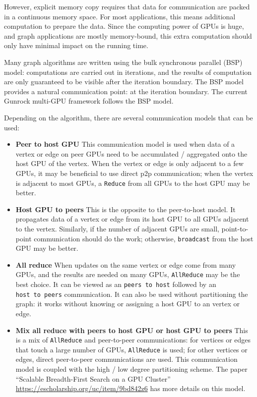 \documentclass[10pt,oneside]{memoir}
\begin{document}
However, explicit memory copy requires that data for communication are
packed in a continuous memory space. For most applications, this means
additional computation to prepare the data. Since the computing power of
GPUs is huge, and graph applications are mostly memory-bound, this extra
computation should only have minimal impact on the running time.

Many graph algorithms are written using the bulk synchronous parallel
(BSP) model: computations are carried out in iterations, and the results
of computation are only guaranteed to be visible after the iteration
boundary. The BSP model provides a natural communication point: at the
iteration boundary. The current Gunrock multi-GPU framework follows the
BSP model.

Depending on the algorithm, there are several communication models that
can be used:

\begin{itemize}
\item
  \textbf{Peer to host GPU} This communication model is used when data
  of a vertex or edge on peer GPUs need to be accumulated / aggregated
  onto the host GPU of the vertex. When the vertex or edge is only
  adjacent to a few GPUs, it may be beneficial to use direct p2p
  communication; when the vertex is adjacent to most GPUs, a
  \texttt{Reduce} from all GPUs to the host GPU may be better.
\item
  \textbf{Host GPU to peers} This is the opposite to the peer-to-host
  model. It propagates data of a vertex or edge from its host GPU to all
  GPUs adjacent to the vertex. Similarly, if the number of adjacent GPUs
  are small, point-to-point communication should do the work; otherwise,
  \texttt{broadcast} from the host GPU may be better.
\item
  \textbf{All reduce} When updates on the same vertex or edge come from
  many GPUs, and the results are needed on many GPUs, \texttt{AllReduce}
  may be the best choice. It can be viewed as an
  \texttt{peers\ to\ host} followed by an \texttt{host\ to\ peers}
  communication. It can also be used without partitioning the graph: it
  works without knowing or assigning a host GPU to an vertex or edge.
\item
  \textbf{Mix all reduce with peers to host GPU or host GPU to peers}
  This is a mix of \texttt{AllReduce} and peer-to-peer communications:
  for vertices or edges that touch a large number of GPUs,
  \texttt{AllReduce} is used; for other vertices or edges, direct
  peer-to-peer communications are used. This communication model is
  coupled with the high / low degree partitioning scheme. The paper
  ``Scalable Breadth-First Search on a GPU Cluster''
  \url{https://escholarship.org/uc/item/9bd842z6} has more details on
  this model.
\end{itemize}
\end{document}
